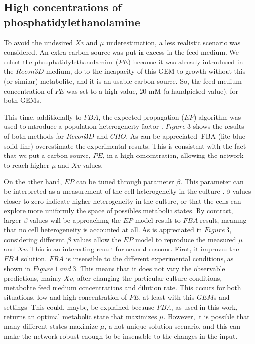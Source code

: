 \subsection{High concentrations of phosphatidylethanolamine}

	To avoid the undesired $Xv$ and $\mu$ underestimation, a less realistic scenario was considered. An extra carbon source was put in excess in the feed medium. We select the phosphatidylethanolamine ($PE$) because it was already introduced in the $Recon3D$ medium, do to the incapacity of this GEM to growth without this (or similar) metabolite, and it is an usable carbon source. So, the feed medium concentration of	$PE$ was set to a high value, 20 mM (a handpicked value), for both GEMs. 
 	
 	
 	
 	This time, additionally to $FBA$, the expected propagation ($EP$) algorithm was used to introduce a population heterogeneity factor . $Figure\ 3$ shows the results of both methods for $Recon3D$ and $CHO$. As can be appreciated, FBA (lite blue solid line) overestimate the experimental results. This is consistent with the fact that we put a carbon source, $PE$, in a high concentration, allowing the network to reach higher $\mu$ and $Xv$ values.
 	
 	 
 	
  	On the other hand, $EP$ can be tuned through parameter $\beta$. This parameter can be interpreted as a measurement of the cell heterogeneity in the culture . $\beta$ values closer to zero indicate higher heterogeneity in the culture, or that the cells can explore more uniformly the space of possibles metabolic states. By contrast, larger $\beta$ values will be approaching the $EP$ model result to $FBA$ result, meaning that no cell heterogeneity is accounted at all. As is appreciated in $Figure\ 3$, considering different $\beta$ values allow the $EP$ model to reproduce the measured $\mu$ and $Xv$. This is an interesting result for several reasons. First, it improves the $FBA$ solution. $FBA$ is insensible to the different experimental conditions, as shown in $Figure\ 1\ and\ 3$. This means that it does not vary the observable predictions, mainly $Xv$, after changing the particular culture conditions, metabolite feed medium concentrations and dilution rate. This occurs for both situations, low and high concentration of $PE$, at least with this $GEM$s and settings. This could, maybe, be explained because $FBA$, as used in this work, returns an optimal metabolic state that maximizes $\mu$. However, it is possible that many different states maximize $\mu$, a not unique solution scenario, and this can make the network robust enough to be insensible to the changes in the input. 
  	
